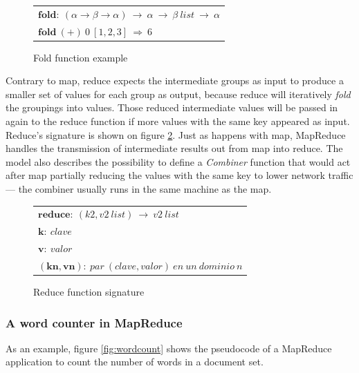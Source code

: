 \begin{figure}[tbp]
\begin{center}
\begin{tabular}{|l|}
\hline
$\mathbf{fold:} \: \left( \alpha \rightarrow \beta \rightarrow \alpha \right) \: \rightarrow \: \alpha \: \rightarrow \: \beta \: list \: \rightarrow \: \alpha$ \\
$\mathbf{fold} \: \left( \mathbf{+} \right) \: 0 \: \left[ 1,2,3 \right] \: \Rightarrow \: 6$ \\
\hline
\end{tabular}
\caption{Fold function example}
\label{fig:fold}
\end{center}
\end{figure}

Contrary to map, reduce expects the intermediate groups as input to produce a smaller set of values for each group as output, because reduce will iteratively \emph{fold} the groupings into values. Those reduced intermediate values will be passed in again to the reduce function if more values with the same key appeared as input. Reduce's signature is shown on figure \ref{fig:reduce}. Just as happens with map, MapReduce handles the transmission of intermediate results out from map into reduce. The model also describes the possibility to define a \emph{Combiner} function that would act after map partially reducing the values with the same key to lower network traffic --- the combiner usually runs in the same machine as the map.

\begin{figure}[tbp]
\begin{center}
\begin{tabular}{|l|}
\hline
$\mathbf{reduce:} \: \left( k2,v2 \: list \right) \: \rightarrow \: v2 \: list$ \\
$\mathbf{k:} \: clave$ \\
$\mathbf{v:} \: valor$ \\
$\mathbf{\left(kn,vn \right):} \: par \: \left(clave,valor\right) \: en \: un \: dominio \: n$ \\
\hline
\end{tabular}
\caption{Reduce function signature}
\label{fig:reduce}
\end{center}
\end{figure}

\subsubsection{A word counter in MapReduce}\label{subsubsec:wordcount}
\noindent As an example, figure \ref{fig:wordcount} shows the pseudocode of a MapReduce application to count the number of words in a document set.

